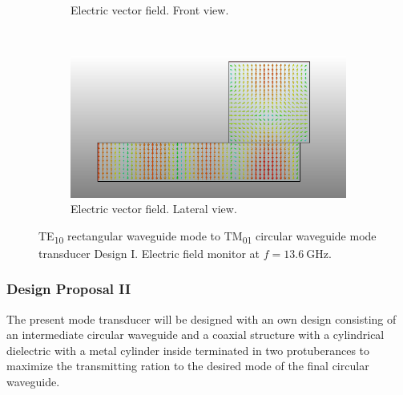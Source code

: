 \documentclass[english,twoside]{article}
\begin{document}
\begin{landscape}
\begin{figure}
\begin{subfigure}[b]{0.5\textwidth}
					\caption{Electric vector field. Front view.}
				\end{subfigure}
				\vspace{10pt}\newline
				~
				\begin{subfigure}[b]{.7\textwidth}
					\includegraphics[width=\textwidth]{figures/wrToWcTM01_irises_lateral}
					\caption{Electric vector field. Lateral view.}
				\end{subfigure}
				\caption{TE\textsubscript{10} rectangular waveguide mode to TM\textsubscript{01} circular waveguide mode transducer Design I. Electric field monitor at $f=\SI{13.6}{\giga\hertz}$.}
        \label{fig:wrToWcTM01_irises_field}
			\end{figure}
		\end{landscape}
		
	\subsubsection{Design Proposal II}
		The present mode transducer will be designed with an own design consisting of an intermediate circular waveguide and a coaxial structure with a cylindrical dielectric with a metal cylinder inside terminated in two protuberances to maximize the transmitting ration to the desired mode of the final circular waveguide.\\
		
\end{document}
